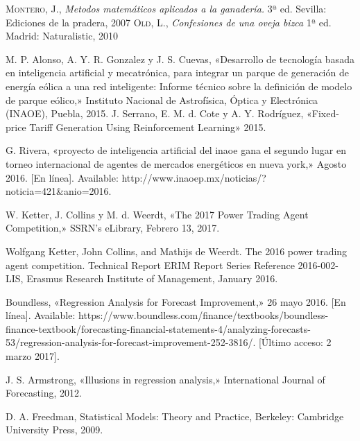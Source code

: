 \renewcommand{\refname}{Bibliografía}
\begin{thebibliography}{a}
	 \textsc{Montero, J.}, \textit{Metodos matemáticos aplicados a la ganadería.} 3ª ed. Sevilla: Ediciones de la pradera, 2007  
	 \textsc{Old, L.}, \textit{Confesiones de una oveja bizca} 1ª ed. Madrid: Naturalistic, 2010 

	 M. P. Alonso, A. Y. R. Gonzalez y J. S. Cuevas, «Desarrollo de tecnología basada en inteligencia artificial y mecatrónica, para integrar un parque de generación de energía eólica a una red inteligente: Informe técnico sobre la definición de modelo de parque eólico,» Instituto Nacional de Astrofísica, Óptica y Electrónica (INAOE), Puebla, 2015.
	 J. Serrano, E. M. d. Cote y A. Y. Rodríguez, «Fixed-price Tariff Generation Using Reinforcement
Learning» 2015.

	 G. Rivera, «proyecto de inteligencia artificial del inaoe gana el segundo lugar en torneo
internacional de agentes de mercados energéticos en nueva york,» Agosto 2016. [En línea].
Available: http://www.inaoep.mx/noticias/?noticia=421\&anio=2016.

	 W. Ketter, J. Collins y M. d. Weerdt, «The 2017 Power Trading Agent Competition,» SSRN's eLibrary, Febrero 13, 2017.

	 Wolfgang Ketter, John Collins, and Mathijs de Weerdt. The 2016 power trading agent competition. Technical Report ERIM Report Series Reference 2016-002-LIS, Erasmus Research
Institute of Management, January 2016.

	Boundless, «Regression Analysis for Forecast Improvement,» 26 mayo 2016. [En línea].
Available: https://www.boundless.com/finance/textbooks/boundless-finance-textbook/forecasting-financial-statements-4/analyzing-forecasts-53/regression-analysis-for-forecast-improvement-252-3816/. [Último acceso: 2 marzo 2017].

	 J. S. Armstrong, «Illusions in regression analysis,» International Journal of Forecasting, 2012.

	 D. A. Freedman, Statistical Models: Theory and Practice, Berkeley: Cambridge University Press, 2009.
		

\end{thebibliography}
